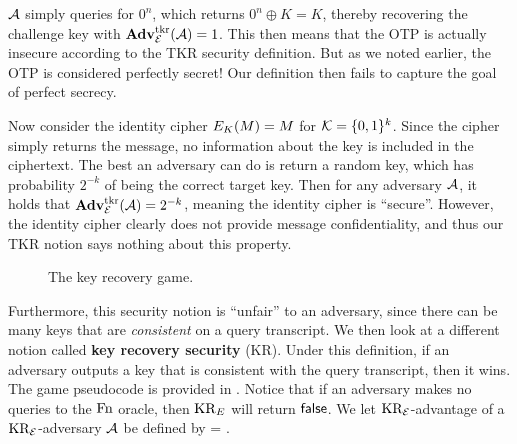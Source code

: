 ${\mathcal A}$ simply queries for $0^n$, which returns $0^n \oplus K = K$, thereby recovering the challenge key with $\mathbf{Adv}^{\mathrm{tkr}}_{{\cal E}}({\mathcal A}) = 1$. This then means that the OTP is actually insecure according to the TKR security definition. But as we noted earlier, the OTP is considered perfectly secret! Our definition then fails to capture the goal of perfect secrecy. 

Now consider the identity cipher $E_{K}(M) = M$ for ${\cal K}=\{0,1\}^k$. Since the cipher simply returns the message, no information about the key is included in the ciphertext. The best an adversary can do is return a random key, which has probability $2^{-k}$ of being the correct target key.
Then for any adversary ${\mathcal A}$, it holds that $\mathbf{Adv}^{\mathrm{tkr}}_{{\cal E}}({\mathcal A}) = 2^{-k}$, meaning the identity cipher is ``secure''. However, the identity cipher clearly does not provide message confidentiality, and thus our TKR notion says nothing about this property.

\begin{wrapfigure}[17]{r}{0pt}
	\caption{The key recovery game.}
	\label{fig:kr}
\end{wrapfigure}

Furthermore, this security notion is ``unfair'' to an adversary, since there can be many keys that are \textit{consistent} on a query transcript. We then look at a different notion called \textbf{key recovery security} (KR). Under this definition, if an adversary outputs a key that is consistent with the query transcript, then it wins. The game pseudocode is provided in . Notice that if an adversary makes no queries to the $\textnormal{Fn}$ oracle, then $\textnormal{KR}_E$ will return $\mathsf{false}$.
We let $\textnormal{KR}_{\cal E}$-advantage of a $\textnormal{KR}_{\cal E}$-adversary ${\mathcal A}$ be defined by 
\bnm
\AdvKR{\cipher}{\advA} = \Prob{\KR^\advA_\cipherE \Rightarrow\true}  \;.
\enm


